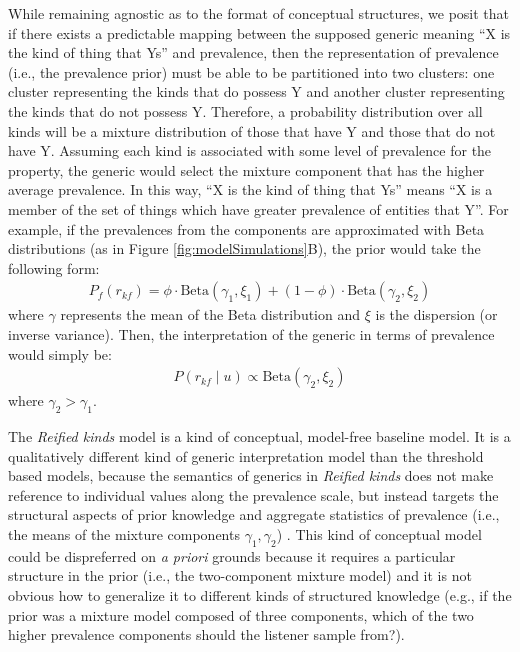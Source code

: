 \documentclass[floatsintext,doc]{apa6}
\begin{document}
While remaining agnostic as to the format of conceptual structures, we posit that if there exists a predictable mapping between the supposed generic meaning ``X is the kind of thing that Ys'' and prevalence, then the representation of prevalence (i.e., the prevalence prior) must be able to be partitioned into two clusters: one cluster representing the kinds that do possess Y and another cluster representing the kinds that do not possess Y. 
Therefore, a probability distribution over all kinds will be a mixture distribution of those that have Y and those that do not have Y. 
Assuming each kind is associated with some level of prevalence for the property, the generic would select the mixture component that has the higher average prevalence.
In this way, ``X is the kind of thing that Ys'' means ``X is a member of the set of things which have greater prevalence of entities that Y''.
For example, if the prevalences from the components are approximated with Beta distributions (as in Figure \ref{fig:modelSimulations}B), the prior would take the following form:
\begin{eqnarray}
P_f(r_{kf}) = \phi \cdot \text{Beta}(\gamma_1, \xi_1) + (1-\phi)\cdot \text{Beta}(\gamma_2, \xi_2)
\end{eqnarray}
\noindent where $\gamma$ represents the mean of the Beta distribution and $\xi$ is the dispersion (or inverse variance).
Then, the interpretation of the generic in terms of prevalence would simply be:
%
\begin{eqnarray}
P (r_{kf} \mid u) \propto  \text{Beta}(\gamma_2, \xi_2) \label{eq:rk}
\end{eqnarray}
%
\noindent where $\gamma_2 > \gamma_1$. 

The \emph{Reified kinds} model is a kind of conceptual, model-free baseline model.
It is a qualitatively different kind of generic interpretation model than the threshold based models, because the semantics of generics in \emph{Reified kinds} does not make reference to individual values along the prevalence scale, but instead targets the structural aspects of prior knowledge and aggregate statistics of prevalence (i.e., the means of the mixture components $\gamma_1, \gamma_2$) . 
This kind of conceptual model could be dispreferred on \emph{a priori} grounds because it requires a particular structure in the prior (i.e., the two-component mixture model) and it is not obvious how to  generalize it to different kinds of structured knowledge (e.g., if the prior was a mixture model composed of three components, which of the two higher prevalence components should the listener sample from?).
\end{document}
